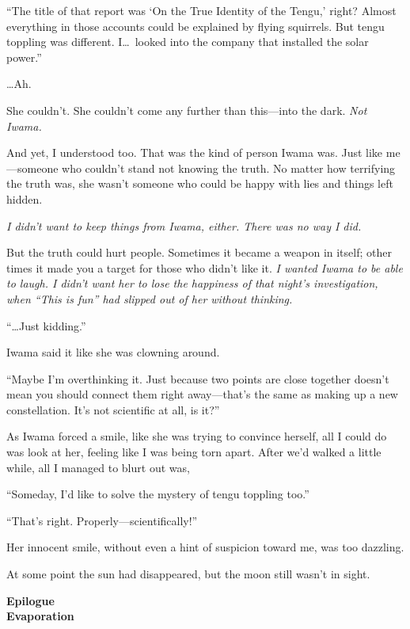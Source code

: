 \documentclass[
    a4paper,
    12pt,
    twoside,
    openany,
    UTF8,
    fontset=windows
]{ctexbook}
\begin{document}
``The title of that report was `On the True Identity of the Tengu,' right? Almost everything in those accounts could be explained by flying squirrels. But tengu toppling was different. I\dots\ looked into the company that installed the solar power.''

\dots Ah.


She couldn't. She couldn't come any further than this---into the dark. \textit{Not Iwama.}

And yet, I understood too. That was the kind of person Iwama was. Just like me---someone who couldn't stand not knowing the truth. No matter how terrifying the truth was, she wasn't someone who could be happy with lies and things left hidden.

\textit{I didn't want to keep things from Iwama, either. There was no way I did.}

But the truth could hurt people. Sometimes it became a weapon in itself; other times it made you a target for those who didn't like it. \textit{I wanted Iwama to be able to laugh. I didn't want her to lose the happiness of that night's investigation, when ``This is fun'' had slipped out of her without thinking.}

``\dots Just kidding.''

Iwama said it like she was clowning around.

``Maybe I'm overthinking it. Just because two points are close together doesn't mean you should connect them right away---that's the same as making up a new constellation. It's not scientific at all, is it?''

As Iwama forced a smile, like she was trying to convince herself, all I could do was look at her, feeling like I was being torn apart. After we'd walked a little while, all I managed to blurt out was,

``Someday, I'd like to solve the mystery of tengu toppling too.''

``That's right. Properly---scientifically!''

Her innocent smile, without even a hint of suspicion toward me, was too dazzling.

At some point the sun had disappeared, but the moon still wasn't in sight.


\clearpage
\thispagestyle{plain}
\begin{center}
    \large\bfseries
    Epilogue\\
    Evaporation
\end{center}
\label{sec:epilogueV2}
\vspace{1cm}
\end{document}
